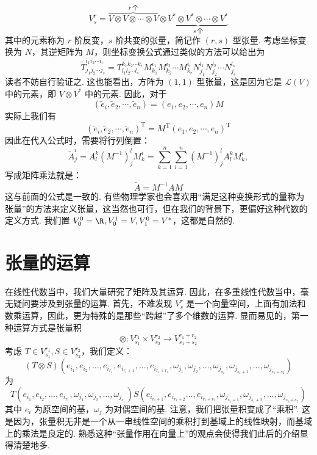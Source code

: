 \[
V_s^r = \overbrace{V \otimes V \otimes \cdots \otimes V}^{r\,\text{个}} \otimes \underbrace{V^* \otimes V^* \otimes \cdots \otimes V^*}_{s\,\text{个}}
\]
其中的元素称为 $r$ 阶反变，$s$ 阶共变的张量，简记作 $(r,s)$ 型张量. 考虑坐标变换为 $N$，其逆矩阵为 $M$，则坐标变换公式通过类似的方法可以给出为
\[
\tilde T^{i_1 i_2 \cdots i_r}_{j_1 j_2 \cdots j_s} = T^{k_1 k_2 \cdots k_r}_{l_1 l_2 \cdots l_s} M_{k_1}^{i_1} M_{k_2}^{i_2} \cdots M_{k_r}^{i_r} N_{j_1}^{l_1} N_{j_2}^{l_2} \cdots N_{j_s}^{l_s}
\]
读者不妨自行验证之. 这也能看出，方阵为 $(1, 1)$ 型张量，这是因为它是 $\mathcal{L}(V)$ 中的元素，即 $V \otimes V^*$ 中的元素. 因此，对于
\[
(\tilde e_i, \tilde e_2, \cdots, \tilde e_n) = (e_1, e_2, \cdots, e_n) M
\]
实际上我们有
\[
(\tilde e_i, \tilde e_2, \cdots, \tilde e_n)^\mathrm{T} = M^\mathrm{T} (e_1, e_2, \cdots, e_n)^\mathrm{T}
\]
因此在代入公式时，需要将行列倒置：
\[\tilde A_j^i = A_l^k (M^{-1})_j^l M_k^i = \sum\limits_{k=1}^n\sum\limits_{l=1}^n (M^{-1})_j^l A_l^k M_k^i,\]
写成矩阵乘法就是：
\[
\tilde A = M^{-1} A M
\]
这与前面的公式是一致的. 有些物理学家也会喜欢用``满足这种变换形式的量称为张量''的方法来定义张量，这当然也可行，但在我们的背景下，更偏好这种代数的定义方式. 我们置 $V_0^0 = \R, V_0^1 = V, V_1^0 = V^*$，这都是自然的.

\section{张量的运算}

在线性代数当中，我们大量研究了矩阵及其运算. 因此，在多重线性代数当中，毫无疑问要涉及到张量的运算. 首先，不难发现 $V_s^r$ 是一个向量空间，上面有加法和数乘运算，因此，更为特殊的是那些``跨越''了多个维数的运算. 显而易见的，第一种运算方式是张量积
\[
\otimes: V_{s_1}^{r_1} \times V_{s_2}^{r_2} \to V_{s_1 + s_2}^{r_1 + r_2}
\]
考虑 $T \in V_{s_1}^{r_1}, S \in V_{s_2}^{r_2}$，我们定义：
\[
(T \otimes S) (e_{i_1}, e_{i_2}, \ldots, e_{i_{r_1}}, e_{i_{r_1 + 1}}, \ldots, e_{i_{r_1 + r_2}}, \omega_{j_1}, \omega_{j_2}, \ldots, \omega_{j_{s_1}}, \omega_{j_{s_1 + 1}}, \ldots, \omega_{j_{s_1 + s_2}})
\]
为
\[
T(e_{i_1}, e_{i_2}, \ldots, e_{i_{r_1}}, \omega_{j_1}, \omega_{j_2}, \ldots, \omega_{j_{s_1}}) S(e_{i_{r_1 + 1}}, e_{i_{r_1 + 2}} \ldots, e_{i_{r_1 + r_2}}, \omega_{j_{s_1 + 1}}, \omega_{j_{s_1 + 2}}, \ldots, \omega_{j_{s_1 + s_2}})
\]
其中 ${e_i}$ 为原空间的基，${\omega_j}$ 为对偶空间的基. 注意，我们把张量积变成了``乘积''. 这是因为，张量积无非是一个从一串线性空间的乘积打到基域上的线性映射，而基域上的乘法是良定的. 熟悉这种``张量作用在向量上''的观点会使得我们此后的介绍显得清楚地多.

